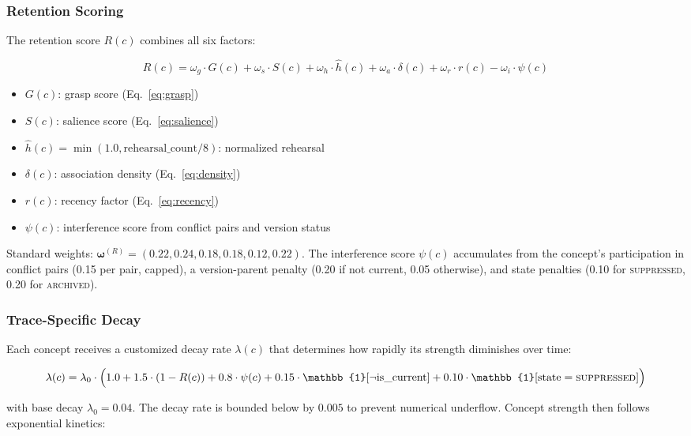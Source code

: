 \documentclass[11pt,twocolumn]{article}
\begin{document}
\subsubsection{Retention Scoring}

The retention score $R(c)$ combines all six factors:

\begin{equation}
R(c) = \omega_g \cdot G(c) + \omega_s \cdot S(c) + \omega_h \cdot \hat{h}(c) + \omega_a \cdot \delta(c) + \omega_r \cdot r(c) - \omega_i \cdot \psi(c)
\label{eq:retention}
\end{equation}

\begin{itemize}
\item $G(c)$: grasp score (Eq.~\ref{eq:grasp})
\item $S(c)$: salience score (Eq.~\ref{eq:salience})
\item $\hat{h}(c) = \min(1.0, \text{rehearsal\_count} / 8)$: normalized rehearsal
\item $\delta(c)$: association density (Eq.~\ref{eq:density})
\item $r(c)$: recency factor (Eq.~\ref{eq:recency})
\item $\psi(c)$: interference score from conflict pairs and version status
\end{itemize}

Standard weights: $\boldsymbol{\omega}^{(R)} = (0.22, 0.24, 0.18, 0.18, 0.12, 0.22)$. The interference score $\psi(c)$ accumulates from the concept's participation in conflict pairs (0.15 per pair, capped), a version-parent penalty (0.20 if not current, 0.05 otherwise), and state penalties (0.10 for \textsc{suppressed}, 0.20 for \textsc{archived}).

\subsubsection{Trace-Specific Decay}

Each concept receives a customized decay rate $\lambda(c)$ that determines how rapidly its strength diminishes over time:

\begin{equation}
\lambda(c) = \lambda_0 \cdot \Big(1.0 + 1.5 \cdot (1 - R(c)) + 0.8 \cdot \psi(c) + 0.15 \cdot \mathbb{1}[\neg\text{is\_current}] + 0.10 \cdot \mathbb{1}[\text{state} = \text{\scshape suppressed}]\Big)
\label{eq:decay}
\end{equation}

with base decay $\lambda_0 = 0.04$. The decay rate is bounded below by $0.005$ to prevent numerical underflow. Concept strength then follows exponential kinetics:
\end{document}

